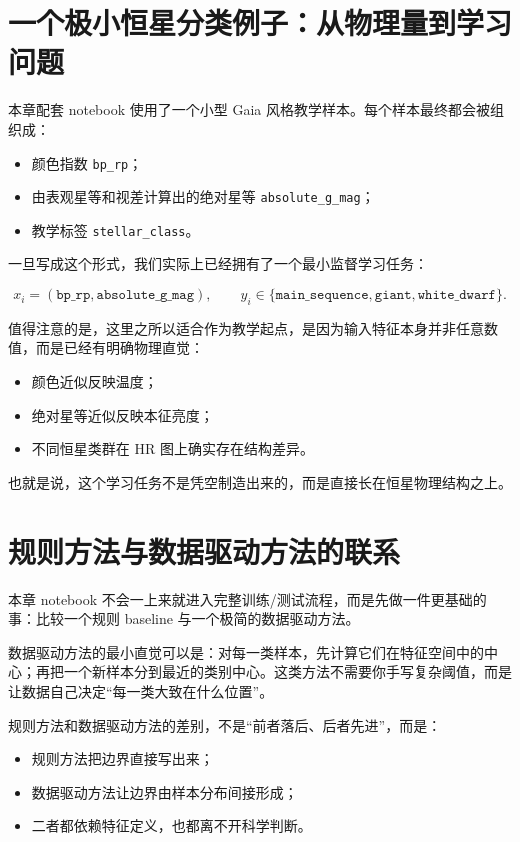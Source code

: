 \section{一个极小恒星分类例子：从物理量到学习问题}

本章配套 notebook 使用了一个小型 Gaia 风格教学样本。每个样本最终都会被组织成：

\begin{itemize}
    \item 颜色指数 \texttt{bp\_rp}；
    \item 由表观星等和视差计算出的绝对星等 \texttt{absolute\_g\_mag}；
    \item 教学标签 \texttt{stellar\_class}。
\end{itemize}

一旦写成这个形式，我们实际上已经拥有了一个最小监督学习任务：

\[
x_i = (\texttt{bp\_rp}, \texttt{absolute\_g\_mag}), \qquad
y_i \in \{\texttt{main\_sequence}, \texttt{giant}, \texttt{white\_dwarf}\}.
\]

值得注意的是，这里之所以适合作为教学起点，是因为输入特征本身并非任意数值，而是已经有明确物理直觉：

\begin{itemize}
    \item 颜色近似反映温度；
    \item 绝对星等近似反映本征亮度；
    \item 不同恒星类群在 HR 图上确实存在结构差异。
\end{itemize}

也就是说，这个学习任务不是凭空制造出来的，而是直接长在恒星物理结构之上。

\section{规则方法与数据驱动方法的联系}

本章 notebook 不会一上来就进入完整训练/测试流程，而是先做一件更基础的事：比较一个规则 baseline 与一个极简的数据驱动方法。

数据驱动方法的最小直觉可以是：对每一类样本，先计算它们在特征空间中的中心；再把一个新样本分到最近的类别中心。这类方法不需要你手写复杂阈值，而是让数据自己决定“每一类大致在什么位置”。

规则方法和数据驱动方法的差别，不是“前者落后、后者先进”，而是：

\begin{itemize}
    \item 规则方法把边界直接写出来；
    \item 数据驱动方法让边界由样本分布间接形成；
    \item 二者都依赖特征定义，也都离不开科学判断。
\end{itemize}

